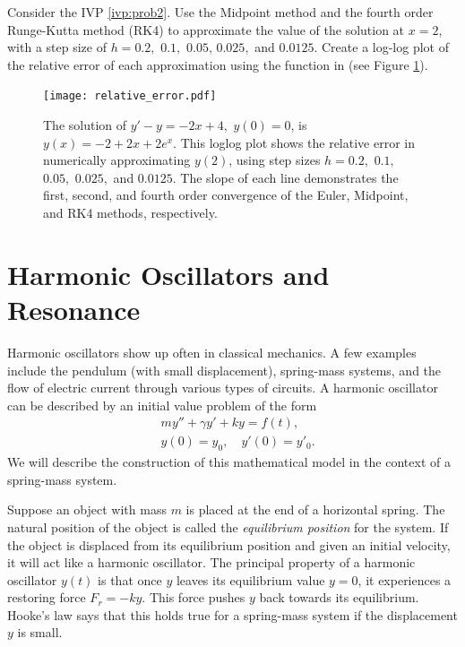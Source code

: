 \begin{problem} Consider the IVP \eqref{ivp:prob2}.
Use the Midpoint method and the fourth order Runge-Kutta method (RK4) to approximate the value of the solution at $x = 2$, with a step size of $h = 0.2,$ $ 0.1,$ $0.05 $, $0.025,$ and $0.0125.$ 
Create a log-log plot of the relative error of each approximation using the  function in  (see Figure \ref{ivp:relative_error}).
\end{problem}

\begin{figure}[ht]
\centering
\texttt{[image: relative\_error.pdf]}
\caption{The solution of $y' -y= -2x+4,$ $y(0) = 0$, is $y(x) = -2+2x + 2e^x.$ This loglog plot shows the relative error in numerically approximating $y(2)$, using step sizes $h = 0.2,$ $0.1,$ $0.05,$ $0.025,$ and $0.0125$. The slope of each line demonstrates the first, second, and fourth order convergence of the Euler, Midpoint, and RK4 methods, respectively.}
\label{ivp:relative_error}
\end{figure}


\section*{Harmonic Oscillators and Resonance} 
Harmonic oscillators show up often in classical mechanics.
A few examples include the pendulum (with small
 displacement), spring-mass systems, and the flow of electric current through various types of circuits.
A harmonic oscillator can be described by an initial value problem of the form
\begin{align*}
	&{}my'' + \gamma y' + ky = f(t) ,\\
	&{}y(0) = y_0,\quad
	y'(0) = y'_0.
\end{align*}
We will describe the construction of this mathematical model in the context of a spring-mass system.

Suppose an object with mass $m$ is placed at the end of a horizontal spring.
The natural position of the object is called the \textit{equilibrium position} for the system.
If the object is displaced from its equilibrium position and given an initial velocity,
it will act like a harmonic oscillator.
The principal property of a harmonic oscillator $y(t)$ is that once $y$ leaves its equilibrium value $y = 0$, it experiences a restoring force $F_r = -ky.$
This force pushes $y$ back towards its equilibrium.
Hooke's law says that this holds true for a
spring-mass system if the displacement $y$ is small.

